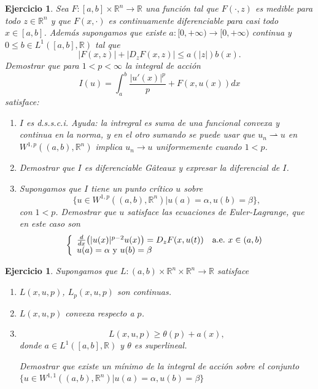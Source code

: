\documentclass{article}
\newcounter{ejer}
\newtheorem{ejercicio}[ejer]{Ejercicio}}
\newcommand{\rr}{\mathbb{R}}
\begin{document}
\begin{ejercicio} Sea $F:[a,b]\times \rr^n\to\rr$ una función tal que $F(\cdot,z)$ es medible para todo $z\in\rr^n$ y que $F(x,\cdot)$ es continuamente diferenciable para casi todo $x\in [a,b]$. Además supongamos que existe $a:[0,+\infty)\to [0,+\infty)$ continua y $0\leq b\in  L^1([a,b],\rr)$ tal que
\[|F(x,z)|+|D_{z}F(x,z)|\leq a(|z|)b(x).\]
Demostrar que para $1< p<\infty$ la integral de acción
\[I(u)=\int_a^b\frac{|u'(x)|^p}{p}+F(x,u(x))dx\]
satisface:
\begin{enumerate}
 \item $I$ es d.s.s.c.i. \emph{Ayuda:}   la intregral es suma de una funcional convexa y continua en la norma, y en el otro sumando se puede usar que $u_n\rightharpoonup u$ en $W^{1,p}((a,b),\rr^n)$ implica $u_n\to u$ uniformemente cuando $1<p$.

 \item Demostrar que $I$ es diferenciable G\^ateaux y expresar la diferencial de $I$.

 \item Supongamos que $I$ tiene un punto crítico $u$ sobre
 \[\{u\in W^{1,p}((a,b),\rr^n)| u(a)=\alpha, u(b)=\beta\},\]
 con $1<p$. Demostrar que $u$ satisface las ecuaciones de  Euler-Lagrange, que en este caso son
 \begin{equation}\label{ProbPrin}
    \left\{%
\begin{array}{ll}
   \frac{d}{dx}\big(|u(x)|^{p-2}u(x)\big)= D_zF(x,u(t)) \quad \hbox{a.e.}\ x \in (a,b)\\
    u(a)=\alpha\text{ y } u(b)=\beta\\
\end{array}%
\right.
\end{equation}

 \end{enumerate}


\end{ejercicio}




\begin{ejercicio}\label{eq: gener_tonelli1} Supongamos que $L:(a,b)\times\rr^n\times\rr^n\to\rr$ satisface
\begin{enumerate}
 \item $L(x,u,p)$, $L_p(x,u,p)$ son continuas.
 \item $L(x,u,p)$ convexa respecto a $p$.
 \item \[L(x,u,p)\geq \theta(p)+a(x),\]
 donde $a\in L^1([a,b],\rr)$ y $\theta$ es superlineal.


 Demostrar que existe un mínimo de la integral de acción sobre el conjunto $\{u\in W^{1,1}((a,b),\rr^n)| u(a)=\alpha, u(b)=\beta\}$
\end{enumerate}


\end{ejercicio}
\end{document}
